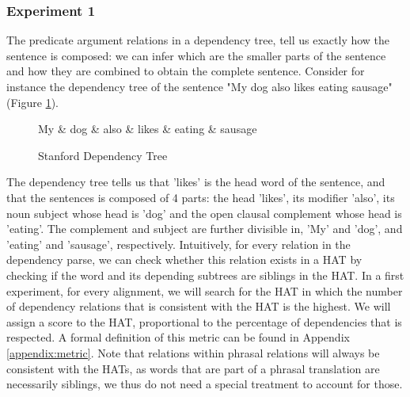 \documentclass{report}
\theoremstyle{definition}
\theoremstyle{plain}
\begin{document}
\subsubsection{Experiment 1}

The predicate argument relations in a dependency tree, tell us exactly how the sentence is composed: we can infer which are the smaller parts of the sentence and how they are combined to obtain the complete sentence. Consider for instance the dependency tree of the sentence "My dog also likes eating sausage" (Figure \ref{fig:deptree1}).

\begin{figure}[!h]\label{fig:deptree1}
\centering
\begin{dependency}[theme=simple]%
\begin{deptext}[column sep=.5cm, row sep=.1ex]
My \& dog \& also \& likes \& eating \& sausage \\
\end{deptext}
\end{dependency}
\caption{Stanford Dependency Tree}
\end{figure}

The dependency tree tells us that 'likes' is the head word of the sentence, and that the sentences is composed of 4 parts: the head 'likes', its modifier 'also', its noun subject whose head is 'dog' and the open clausal complement whose head is 'eating'. The complement and subject are further divisible in, 'My' and 'dog', and 'eating' and 'sausage', respectively. Intuitively, for every relation in the dependency parse, we can check whether this relation exists in a HAT by checking if the word and its depending subtrees are siblings in the HAT.
In a first experiment, for every alignment, we will search for the HAT in which the number of dependency relations that is consistent with the HAT is the highest. We will assign a score to the HAT, proportional to the percentage of dependencies that is respected. A formal definition of this metric can be found in Appendix \ref{appendix:metric}. Note that relations within phrasal relations will always be consistent with the HATs, as words that are part of a phrasal translation are necessarily siblings, we thus do not need a special treatment to account for those.
\end{document}
